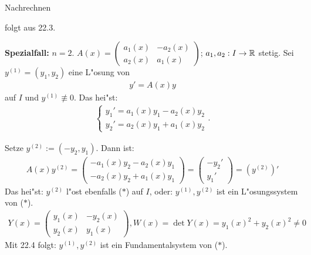 \documentclass[a4paper,twoside,DIV15,BCOR12mm,chapterprefix=true,headings=twolinechapter]{scrbook}
\begin{document}
\begin{beweise}
\item Nachrechnen
\item folgt aus 22.3.
\end{beweise}


\textbf{Spezialfall:} $n=2$. $A(x) = \begin{pmatrix} a_1(x) & -a_2(x) \\ a_2(x) & a_1(x) \end{pmatrix}$; $a_1, a_2 : I \to \mathbb{R}$ stetig. Sei $y^{(1)} = (y_1, y_2)$ eine L"osung von
\begin{align*}
\tag{$*$} y' = A(x) y
\end{align*}
auf $I$ und $y^{(1)} \not\equiv 0$. Das hei"st:
\begin{align*}
\begin{cases}
y_1' = a_1(x) y_1 - a_2(x) y_2 \\
y_2' = a_2(x) y_1 + a_1(x) y_2
\end{cases}.
\end{align*}

Setze $y^{(2)} := (-y_2, y_1)$. Dann ist:
\begin{align*}
A(x) y^{(2)} = \begin{pmatrix} -a_1(x) y_2 - a_2(x) y_1 \\ -a_2(x) y_2 + a_1(x) y_1 \end{pmatrix} = \begin{pmatrix} -y_2' \\ y_1' \end{pmatrix} = \left( y^{(2)} \right)'
\end{align*}
Das hei"st: $y^{(2)}$ l"ost ebenfalls ($*$) auf $I$, oder: $y^{(1)}, y^{(2)}$ ist ein L"osungssystem von ($*$).
\begin{align*}
Y(x) = \begin{pmatrix} y_1(x) & -y_2(x) \\ y_2(x) & y_1(x) \end{pmatrix}, W(x) = \det Y(x) = y_1(x)^2 + y_2(x)^2 \neq 0
\end{align*}
Mit 22.4 folgt: $y^{(1)}, y^{(2)}$ ist ein Fundamentalsystem von ($*$).
\end{document}
